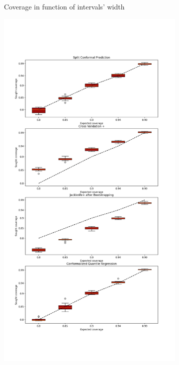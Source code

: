 \begin{figure}[ht]
\begin{subfigure}[b]{0.32\textwidth}
        \caption{Coverage in function of intervals' width}
        \label{subfig:regression-coverage-width}
    \end{subfigure}
    \hfill %
    \begin{subfigure}[b]{0.32\textwidth} %
        \centering
        \includegraphics[width=1.15\textwidth, height=3\textwidth]{Figures/regression/coverage-vs-alpha-regression-problem.png} %

\end{subfigure}
\end{figure}
